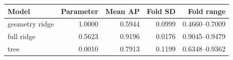\begin{tabular}{lrrrr}\toprule
Model & Parameter & Mean AP & Fold SD & Fold range\\\midrule
geometry ridge & 1.0000 & 0.5944 & 0.0999 & 0.4660--0.7009\\
full ridge & 0.5623 & 0.9196 & 0.0176 & 0.9045--0.9479\\
tree & 0.0010 & 0.7913 & 0.1199 & 0.6348--0.9362\\
\bottomrule\end{tabular}
